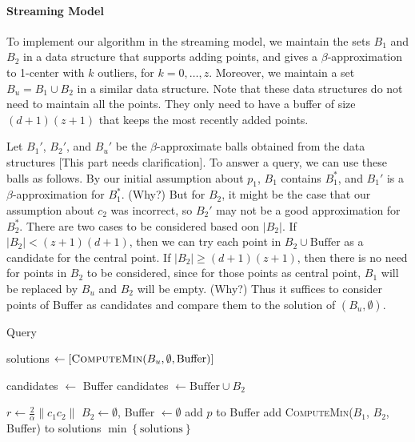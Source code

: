 \documentclass[envcountsame]{cls/cccg15}
\newcommand{\rc}{r}
\newcommand{\dz}{(d + 1)(z + 1)}
\newcommand{\Call}[2]{\textsc{#1}(#2)}
\newcommand{\set}[1]{\left\{ #1 \right\}}
\newcommand{\card}[1]{\left|{#1}\right|}
\newcommand{\len}[1]{\|{#1}\|}
\newcommand{\gee}{\geqslant}
\renewcommand{\ge}{\gee}
\begin{document}
\paragraph{Streaming Model}
To implement our algorithm in the streaming model,
we maintain the sets $B_1$ and $B_2$ 
in a data structure that supports adding points,
and gives a $\beta$-approximation to 1-center with $k$ outliers, for $k=0,\dots,z$.
Moreover, we maintain a set $B_u = B_1 \cup B_2$ in a similar data structure.
Note that these data structures do not need to maintain all the points. 
They only need to have a buffer of size $\dz$ that keeps the most recently added points.

Let $B_1'$, $B_2'$, and $B_u'$ be the $\beta$-approximate balls obtained from the data structures
[This part needs clarification].
To answer a query, we can use these balls as follows. 
By our initial assumption about $p_1$, $B_1$ contains $B_1^*$,
and $B_1'$ is a $\beta$-approximation for $B_1^*$. (Why?)
But for $B_2$, it might be the case that our assumption about $c_2$ 
was incorrect, so $B_2'$ may not be a good approximation for $B_2^*$. 
There are two cases to be considered based oon $\card{B_2}$. 
If $\card{B_2} < (z+1)(d+1)$, then we can try each point in 
$B_2 \cup \mbox{Buffer}$ as a candidate for the central point. 
If $\card{B_2} \ge \dz$, then there is no need for points in $B_2$ to be considered, 
since for those points as central point, $B_1$ will be replaced by $B_u$ and $B_2$ will be empty. (Why?)
Thus it suffices to consider points of Buffer as candidates 
and compare them to the solution of $(B_u, \emptyset)$.


\begin{algorithm}
\caption{\sc Query} 
\label{alg:query}
\begin{algorithmic}[1]
	\STATE solutions $\gets [\Call{ComputeMin}{B_u, \emptyset, \text{Buffer}}]$
	
	\STATE candidates $\gets$ Buffer
	\IF {$\card{B_2} < \dz$}
		\STATE candidates $\gets \text{Buffer} \cup B_2$ %
	\ENDIF

		\STATE $\rc  \gets \frac{2}{\alpha} \len{c_1 c_2}$
		\STATE $B_2 \gets \emptyset$, Buffer $\gets \emptyset$ 
			\IF{\NOT \Call{AddToB$_2$}{$p$}}
				\STATE add $p$ to Buffer
			\ENDIF
		\ENDFOR
		\STATE add \Call{ComputeMin}{$B_1$, $B_2$, Buffer} to solutions
	\ENDFOR
	\RETURN $\min\set{\text{solutions}}$
\end{algorithmic}
\end{algorithm}
\end{document}
